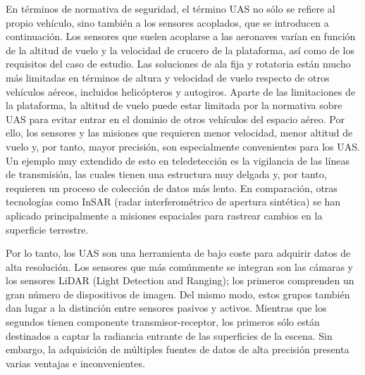 En términos de normativa de seguridad, el término UAS no sólo se refiere al propio vehículo, sino también a los sensores acoplados, que se introducen a continuación. Los sensores que suelen acoplarse a las aeronaves varían en función de la altitud de vuelo y la velocidad de crucero de la plataforma, así como de los requisitos del caso de estudio. Las soluciones de ala fija y rotatoria están mucho más limitadas en términos de altura y velocidad de vuelo respecto de otros vehículos aéreos, incluidos helicópteros y autogiros. Aparte de las limitaciones de la plataforma, la altitud de vuelo puede estar limitada por la normativa sobre UAS para evitar entrar en el dominio de otros vehículos del espacio aéreo. Por ello, los sensores y las misiones que requieren menor velocidad, menor altitud de vuelo y, por tanto, mayor precisión, son especialmente convenientes para los UAS. Un ejemplo muy extendido de esto en teledetección es la vigilancia de las líneas de transmisión, las cuales tienen una estructura muy delgada y, por tanto, requieren un proceso de colección de datos más lento. En comparación, otras tecnologías como InSAR (radar interferométrico de apertura sintética) se han aplicado principalmente a misiones espaciales para rastrear cambios en la superficie terrestre.

Por lo tanto, los UAS son una herramienta de bajo coste para adquirir datos de alta resolución. Los sensores que más comúnmente se integran son las cámaras y los sensores LiDAR (Light Detection and Ranging); los primeros comprenden un gran número de dispositivos de imagen. Del mismo modo, estos grupos también dan lugar a la distinción entre sensores pasivos y activos. Mientras que los segundos tienen componente transmisor-receptor, los primeros sólo están destinados a captar la radiancia entrante de las superficies de la escena. Sin embargo, la adquisición de múltiples fuentes de datos de alta precisión presenta varias ventajas e inconvenientes. 

